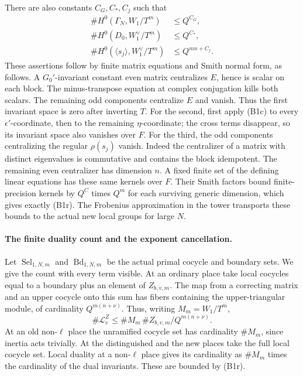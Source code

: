 There are also constants \(C_G,C_*,C_j\) such that
\[
 \begin{array}{rl}
 \#H^0(\Gamma_N,W_1/T^m)&\leq Q^{C_G},\\
 \#H^0(D_0,W_1^\vee/T^m)&\leq Q^{C_*},\\
 \#H^0(\langle s_j\rangle,W_1^\vee/T^m)
                                      &\leq Q^{mn+C_j}.
 \end{array}
 \tag{B1r}
\]
These assertions follow by finite matrix equations and Smith
normal form, as follows.
A \(G_0'\)-invariant constant even matrix centralizes \(E\),
hence is scalar on each block.
The minus-transpose equation at complex conjugation kills
both scalars.
The remaining odd components centralize \(E\) and vanish.
Thus the first invariant space is zero after inverting \(T\).
For the second, first apply (B1c) to every \(\epsilon'\)-coordinate,
then to the remaining \(\eta\)-coordinate; the cross terms
disappear, so its invariant space also vanishes over \(F\).
For the third, the odd components centralizing the regular
\(\rho(s_j)\) vanish.
Indeed the centralizer of a matrix with distinct eigenvalues
is commutative and contains the block idempotent.
The remaining even centralizer has dimension \(n\).
A fixed finite set of the defining linear equations has these
same kernels over \(F\).
Their Smith factors bound finite-precision kernels by
\(Q^C\) times \(Q^{m}\) for each surviving generic dimension,
which gives exactly (B1r).
The Frobenius approximation in the tower transports these
bounds to the actual new local groups for large \(N\).

\paragraph{The finite duality count and the exponent cancellation.}
Let \(\operatorname{Sel}_{1,N,m}\) and
\(\operatorname{Bd}_{1,N,m}\) be the actual primal cocycle and
boundary sets.
We give the count with every term visible.
At an ordinary place take local cocycles equal to a boundary
plus an element of \(Z_{b,v,m}\).
The map from a correcting matrix and an upper cocycle onto
this sum has fibers containing the upper-triangular module,
of cardinality \(Q^{m(n+\nu)}\).
Thus, writing \(M_m=W_1/T^m\),
\[
       \#\mathcal L^Z_v
               \leq \#M_m\,
                       \#Z_{b,v,m}/Q^{m(n+\nu)} .
 \tag{B1s}
\]
At an old non-\(\ell\) place the unramified cocycle set has
cardinality \(\#M_m\), since inertia acts trivially.
At the distinguished and the new places take the full local
cocycle set.
Local duality at a non-\(\ell\) place gives its cardinality
as \(\#M_m\) times the cardinality of the dual invariants.
These are bounded by (B1r).

